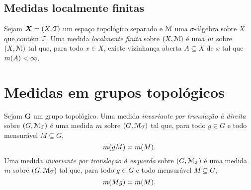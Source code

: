 
\subsection{Medidas localmente finitas}

\begin{definition}
Sejam $\bm X = (X,\mathcal{T})$ um espaço topológico separado e $\mathcal{M}$ uma $\sigma$-álgebra sobre $X$ que contém $\mathcal{T}$. Uma medida \emph{localmente finita} sobre $(X,\mathcal{M})$ é uma $m$ sobre $(X,\mathcal{M})$ tal que, para todo $x \in X$, existe vizinhança aberta $A \subseteq X$ de $x$ tal que $m(A) < \infty$.\end{definition}



\section{Medidas em grupos topológicos}

\begin{definition}
Sejam $\bm G$ um grupo topológico. Uma medida \emph{invariante por translação à direita} sobre $(G,\mathcal{M}_{\mathcal{T}})$ é uma medida $m$ sobre $(G,\mathcal{M}_{\mathcal{T}})$ tal que, para todo $g \in G$ e todo mensurável $M \subseteq G$,
	\begin{equation*}
	m(gM) = m(M).
	\end{equation*}
Uma medida \emph{invariante por translação à esquerda} sobre $(G,\mathcal{M}_{\mathcal{T}})$ é uma medida $m$ sobre $(G,\mathcal{M}_{\mathcal{T}})$ tal que, para todo $g \in G$ e todo mensurável $M \subseteq G$,
	\begin{equation*}
	m(Mg) = m(M).
	\end{equation*}
\end{definition}

